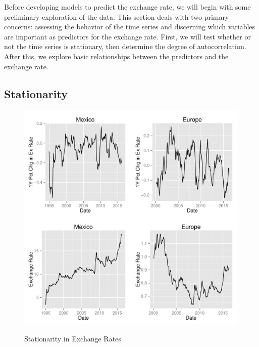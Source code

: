 \documentclass{sig-alternate-05-2015}
\begin{document}
Before developing models to predict the exchange rate, we will begin with some preliminary exploration of the data. This section deals with two primary concerns: assessing the behavior of the time series and discerning which variables are important as predictors for the exchange rate. First, we will test whether or not the time series is stationary, then determine the degree of autocorrelation. After this, we explore basic relationships between the predictors and the exchange rate.

\subsection{Stationarity}

\begin{figure}
\centering
\caption{Stationarity in Exchange Rates}
\includegraphics[scale=0.45]{stationarity.pdf}
\label{fig:rates_time}
\end{figure}
\end{document}
